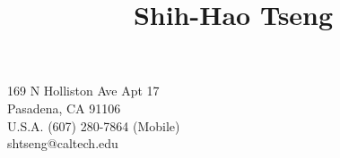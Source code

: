 \title{Shih-Hao Tseng}{
169 N Holliston Ave Apt 17\\
Pasadena, CA 91106\\
U.S.A.
}{
(607) 280-7864 (Mobile) \\
shtseng@caltech.edu
}